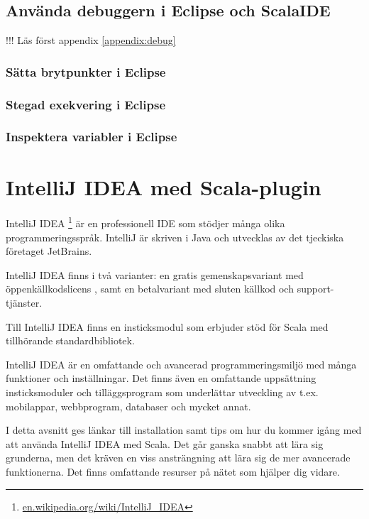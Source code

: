 \subsection{Använda debuggern i Eclipse och ScalaIDE}

!!! Läs först appendix \ref{appendix:debug}

\subsubsection{Sätta brytpunkter i Eclipse}\TODO
\subsubsection{Stegad exekvering i Eclipse}\TODO
\subsubsection{Inspektera variabler i Eclipse}\TODO


\newpage %

\section{IntelliJ IDEA med Scala-plugin}\label{appendix:ide:intellij}

IntelliJ IDEA%
\footnote{\href{https://en.wikipedia.org/wiki/IntelliJ_IDEA}{en.wikipedia.org/wiki/IntelliJ\_IDEA}}
 är en professionell IDE som stödjer många olika programmeringsspråk. IntelliJ är skriven i Java och utvecklas av det tjeckiska företaget JetBrains.

IntelliJ IDEA finns i två varianter: en gratis gemenskapsvariant med öppenkällkodslicens , samt en betalvariant med sluten källkod och support-tjänster.


Till IntelliJ IDEA finns en insticksmodul  som erbjuder stöd för Scala med tillhörande standardbibliotek.

IntelliJ IDEA är en omfattande och avancerad programmeringsmiljö med många funktioner och inställningar. Det finns även en omfattande uppsättning insticksmoduler och tilläggsprogram som underlättar utveckling av t.ex. mobilappar, webbprogram, databaser och mycket annat.

I detta avsnitt ges länkar till installation samt tips om hur du kommer igång med att använda IntelliJ IDEA med Scala. Det går ganska snabbt att lära sig grunderna, men det kräven en viss ansträngning att lära sig de mer avancerade funktionerna. Det finns omfattande resurser på nätet som hjälper dig vidare.

